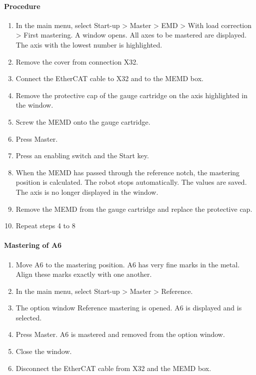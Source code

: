 		\paragraph{Procedure}
		\begin{enumerate}
			\item In the main menu, select Start-up > Master > EMD > With load correction > First mastering. A window opens. All axes to be mastered are displayed. The axis with the lowest number is highlighted.
			\item Remove the cover from connection X32.
			\item Connect the EtherCAT cable to X32 and to the MEMD box.
			\item Remove the protective cap of the gauge cartridge on the axis highlighted in the window.
			\item Screw the MEMD onto the gauge cartridge.
			\item Press Master.
			\item Press an enabling switch and the Start key.
			\item When the MEMD has passed through the reference notch, the mastering position is calculated. The robot stops automatically. The values are saved. The axis is no longer displayed in the window.
			\item Remove the MEMD from the gauge cartridge and replace the protective cap.
			\item Repeat steps 4 to 8 
		\end{enumerate}
	
		\paragraph{Mastering of A6}
		\begin{enumerate}
			\item Move A6 to the mastering position. A6 has very fine marks in the metal. Align these marks exactly with one another.
			\item In the main menu, select Start-up > Master > Reference.
			\item The option window Reference mastering is opened. A6 is displayed and is selected.
			\item Press Master. A6 is mastered and removed from the option window.
			\item Close the window.
			\item Disconnect the EtherCAT cable from X32 and the MEMD box.
		\end{enumerate}
		

